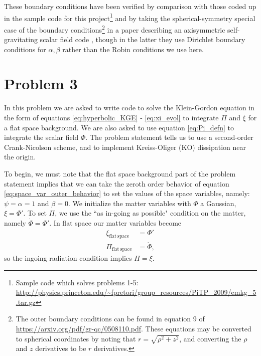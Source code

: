 \documentclass[12pt]{article}
\numberwithin{equation}{section}
\begin{document}
These boundary conditions have been verified by comparison with those coded up in the sample code for this project\footnote{Sample code which solves problems 1-5: \url{http://physics.princeton.edu/~fpretori/group_resources/PiTP_2009/emkg_5.tar.gz}} and by taking the spherical-symmetry special case of the boundary conditions\footnote{The outer boundary conditions can be found in equation 9 of \url{https://arxiv.org/pdf/gr-qc/0508110.pdf}.  These equations may be converted to spherical coordinates by noting that $r = \sqrt{\rho^2 + z^2}$, and converting the $\rho$ and $z$ derivatives to be $r$ derivatives.} in a paper describing an axisymmetric self-gravitating scalar field code \cite{Pretorius06}, though in the latter they use Dirichlet boundary conditions for $\alpha, \beta$ rather than the Robin conditions we use here.

\section{Problem 3}
In this problem we are asked to write code to solve the Klein-Gordon equation in the form of equations \ref{eq:hyperbolic_KGE} - \ref{eq:xi_evol} to integrate $\Pi$ and $\xi$ for a flat space background.  We are also asked to use equation \ref{eq:Pi_defn} to integrate the scalar field $\Phi$.  The problem statement tells us to use a second-order Crank-Nicolson scheme, and to implement Kreiss-Oliger (KO) dissipation near the origin.

To begin, we must note that the flat space background part of the problem statement implies that we can take the zeroth order behavior of equation \ref{eq:space_var_outer_behavior} to set the values of the space variables, namely: $\psi = \alpha = 1$ and $\beta = 0$.  We initialize the matter variables with $\Phi$ a Gaussian, $\xi = \Phi'$.  To set $\Pi$, we use the ``as in-going as possible" condition on the matter, namely $\dot{\Phi} = \Phi'$.  In flat space our matter variables become
\begin{equation*}
\begin{aligned}
\xi_{\mathrm{flat~space}} &= \Phi' \\
\Pi_{\mathrm{flat~space}} &= \dot{\Phi},
\end{aligned}
\end{equation*}
so the ingoing radiation condition implies $\Pi = \xi$.
\end{document}
